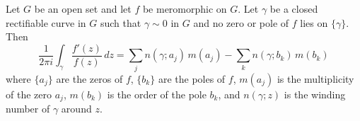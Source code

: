 Let $G$ be an open set and let $f$ be meromorphic on $G$. Let $\gamma$ be a closed rectifiable curve in $G$ such that $\gamma \sim 0$ in $G$ and no zero or pole of $f$ lies on $\{\gamma\}$. Then
$$
\frac{1}{2\pi i} \int_{\gamma} \frac{f'(z)}{f(z)}\,dz = \sum_{j} n(\gamma; a_j) \, m(a_j) - \sum_{k} n(\gamma; b_k) \, m(b_k)
$$
where $\{a_j\}$ are the zeros of $f$, $\{b_k\}$ are the poles of $f$, $m(a_j)$ is the multiplicity of the zero $a_j$, $m(b_k)$ is the order of the pole $b_k$, and $n(\gamma; z)$ is the winding number of $\gamma$ around $z$.
